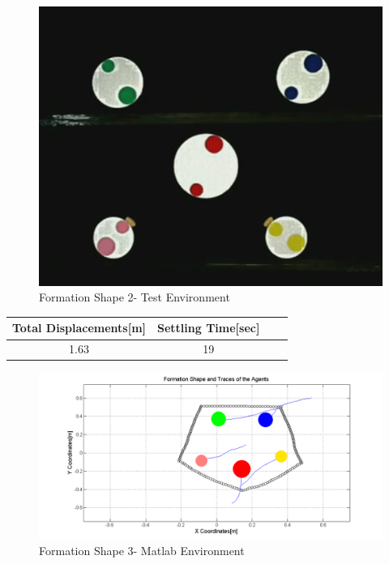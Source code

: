 \begin{figure}[H]
\caption{Formation Shape 2- Test Environment}
\centerline{\includegraphics[scale = 0.35]{4_real_hardware}}
\end{figure} 
					
\begin{center}
 \label{hardwareshape2_ref} 
\begin{tabular}{||c| c |c |c ||}
\hline
\textbf{Total Displacements[m]}  & \textbf{Settling Time[sec]}\\ 
\hline
1.63 & 19 \\
\hline
\end{tabular}
\end{center}
				
\begin{figure}[H]
\caption{Formation Shape 3- Matlab Environment}
\centerline{\includegraphics[scale = 0.45]{5_hardware}}
\end{figure} 
					
